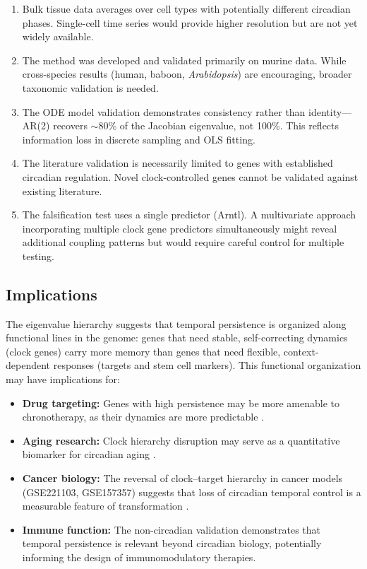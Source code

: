 \documentclass[11pt,letterpaper]{article}
\begin{document}
\begin{enumerate}
\item Bulk tissue data averages over cell types with potentially different circadian phases. Single-cell time series would provide higher resolution but are not yet widely available.

\item The method was developed and validated primarily on murine data. While cross-species results (human, baboon, \textit{Arabidopsis}) are encouraging, broader taxonomic validation is needed.

\item The ODE model validation demonstrates consistency rather than identity---AR(2) recovers $\sim$80\% of the Jacobian eigenvalue, not 100\%. This reflects information loss in discrete sampling and OLS fitting.

\item The literature validation is necessarily limited to genes with established circadian regulation. Novel clock-controlled genes cannot be validated against existing literature.

\item The falsification test uses a single predictor (Arntl). A multivariate approach incorporating multiple clock gene predictors simultaneously might reveal additional coupling patterns but would require careful control for multiple testing.
\end{enumerate}

\subsection{Implications}

The eigenvalue hierarchy suggests that temporal persistence is organized along functional lines in the genome: genes that need stable, self-correcting dynamics (clock genes) carry more memory than genes that need flexible, context-dependent responses (targets and stem cell markers). This functional organization may have implications for:

\begin{itemize}
\item \textbf{Drug targeting:} Genes with high persistence may be more amenable to chronotherapy, as their dynamics are more predictable \citep{dallmann2016chronopharmacology}.
\item \textbf{Aging research:} Clock hierarchy disruption may serve as a quantitative biomarker for circadian aging \citep{kondratov2006early, mattis2016circadian}.
\item \textbf{Cancer biology:} The reversal of clock--target hierarchy in cancer models (GSE221103, GSE157357) suggests that loss of circadian temporal control is a measurable feature of transformation \citep{fu2003circadian, masri2015circadian}.
\item \textbf{Immune function:} The non-circadian validation demonstrates that temporal persistence is relevant beyond circadian biology, potentially informing the design of immunomodulatory therapies.
\end{itemize}
\end{document}
